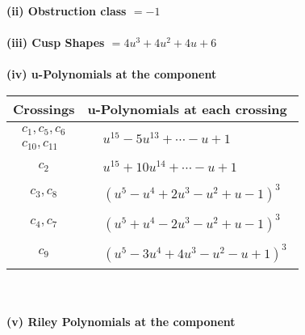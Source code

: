 \documentclass[1p]{elsarticle_modified}
\theoremstyle{definition}
\begin{document}
\flushleft \textbf{(ii) Obstruction class $= -1$}\\~\\
\flushleft \textbf{(iii) Cusp Shapes $= 4 u^3+4 u^2+4 u+6$}\\~\\
\newpage\renewcommand{\arraystretch}{1}
\flushleft \textbf{(iv) u-Polynomials at the component}\newline \\
\begin{tabular}{m{50pt}|m{274pt}}
Crossings & \hspace{64pt}u-Polynomials at each crossing \\
\hline $$\begin{aligned}c_{1},c_{5},c_{6}\\c_{10},c_{11}\end{aligned}$$&$\begin{aligned}
&u^{15}-5 u^{13}+\cdots- u+1
\end{aligned}$\\
\hline $$\begin{aligned}c_{2}\end{aligned}$$&$\begin{aligned}
&u^{15}+10 u^{14}+\cdots- u+1
\end{aligned}$\\
\hline $$\begin{aligned}c_{3},c_{8}\end{aligned}$$&$\begin{aligned}
&(u^5- u^4+2 u^3- u^2+u-1)^3
\end{aligned}$\\
\hline $$\begin{aligned}c_{4},c_{7}\end{aligned}$$&$\begin{aligned}
&(u^5+u^4-2 u^3- u^2+u-1)^3
\end{aligned}$\\
\hline $$\begin{aligned}c_{9}\end{aligned}$$&$\begin{aligned}
&(u^5-3 u^4+4 u^3- u^2- u+1)^3
\end{aligned}$\\
\hline
\end{tabular}\\~\\
\newpage\renewcommand{\arraystretch}{1}
\flushleft \textbf{(v) Riley Polynomials at the component}\newline \\
\end{document}
